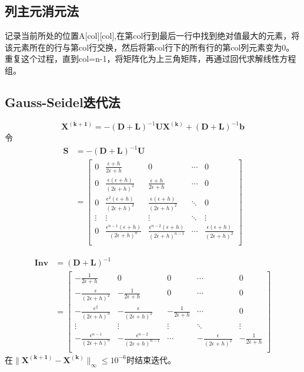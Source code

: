 \documentclass{ctexart}
\begin{document}
\subsection{列主元消元法}
记录当前所处的位置A[col][col],在第col行到最后一行中找到绝对值最大的元素，将该元素所在的行与第col行交换，然后将第col行下的所有行的第col列元素变为0。重复这个过程，直到col=n-1，将矩阵化为上三角矩阵，再通过回代求解线性方程组。
\subsection{Gauss-Seidel迭代法}
		
$$\mathbf{X^{(k+1)}}=-(\mathbf{D}+\mathbf{L})^{-1}\mathbf{U}\mathbf{X^{(k)}}+(\mathbf{D}+\mathbf{L})^{-1}\mathbf{b}$$
    令            
	\begin{align*}
		\mathbf{S} &= -(\mathbf{D}+\mathbf{L})^{-1}\mathbf{U} \\
		&= \begin{bmatrix}
		0 & \frac{\epsilon + h}{2\epsilon + h} & 0 & \cdots & 0 \\
		0 & \frac{\epsilon(\epsilon + h)}{(2\epsilon + h)^2}  & \frac{\epsilon + h}{2\epsilon + h}& \cdots & 0 \\
		0 & \frac{\epsilon^2(\epsilon + h)}{(2\epsilon + h)^3} & \frac{\epsilon(\epsilon + h)}{(2\epsilon + h)^2} & \ddots & 0 \\
		\vdots & \vdots & \vdots & \ddots & \vdots \\
		0 & \frac{\epsilon^{n-1}(\epsilon + h)}{(2\epsilon + h)^n} &  \frac{\epsilon^{n-2}(\epsilon + h)}{(2\epsilon + h)^{n-1}} & \cdots & \frac{\epsilon(\epsilon + h)}{(2\epsilon + h)^2} \\
		\end{bmatrix}
		\end{align*}
	
	\begin{align*}
	\mathbf{Inv} &= (\mathbf{D}+\mathbf{L})^{-1} \\
	&= \begin{bmatrix}
	-\frac{1}{2\epsilon + h} & 0 & 0 & \cdots & 0 \\
	-\frac{\epsilon}{(2\epsilon + h)^2} & -\frac{1}{2\epsilon + h} & 0 & \cdots & 0 \\
	-\frac{\epsilon^2}{(2\epsilon + h)^3} & -\frac{\epsilon}{(2\epsilon + h)^2} & -\frac{1}{2\epsilon + h} & \cdots & 0 \\
	\vdots & \vdots & \vdots & \ddots & \vdots \\
	-\frac{\epsilon^{n-1}}{(2\epsilon + h)^n} & -\frac{\epsilon^{n-2}}{(2\epsilon + h)^{n-1}} & \cdots & -\frac{\epsilon}{(2\epsilon + h)^2} & -\frac{1}{2\epsilon + h} \\
	\end{bmatrix}
	\end{align*}
	在$\|\mathbf{X^{(k+1)}}-\mathbf{X^{(k)}}\|_{\infty}\leq10^{-6}$时结束迭代。
	
\end{document}
